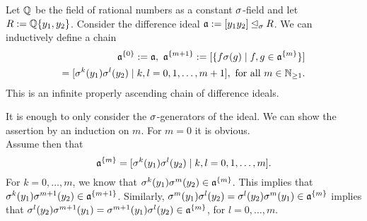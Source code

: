 \begin{ex}\label{nombasisex}
Let $\mathbb{Q}$ be the field of rational numbers as a constant $\sigma$-field and let $R:= \mathbb{Q}\{y_1,y_2\}$. Consider the difference ideal $\mathfrak{a}:= [y_1y_2] \unlhd_{\sigma} R$. We can inductively define a chain \begin{align*}\mathfrak{a}^{\{0\}}:= \mathfrak{a},~ \mathfrak{a}^{\{m+1\}}:= [\{ f \sigma(g) \mid f,g \in \mathfrak{a}^{\{m\}}\}] \\ = [\sigma^k(y_1)\sigma^l(y_2) \mid k,l = 0,1,\ldots,m+1], \text{ for all } m \in \mathbb{N}_{\geq1}.\end{align*}
This is an infinite properly ascending chain of difference ideals. 

\begin{bew}
It is enough to only consider the $\sigma$-generators of the ideal. We can show the assertion by an induction on $m$. For $m=0$ it is obvious. \\
Assume then that $$\mathfrak{a}^{\{m\}} = [\sigma^k(y_1)\sigma^l(y_2) \mid k,l = 0,1,\ldots,m].$$
For $k = 0,\ldots,m$, we know that $\sigma^k(y_1)\sigma^m(y_2) \in \mathfrak{a}^{\{m\}}$. This implies that $\sigma^k(y_1)\sigma^{m+1}(y_2) \in \mathfrak{a}^{\{m+1\}}$.
Similarly, $\sigma^m(y_1)\sigma^l(y_2) = \sigma^l(y_2)\sigma^m(y_1) \in \mathfrak{a}^{\{m\}}$ implies that $ \sigma^l(y_2)\sigma^{m+1}(y_1) = \sigma^{m+1}(y_1)\sigma^l(y_2) \in \mathfrak{a}^{\{m\}}$, for $l = 0,\ldots,m$.
\end{bew}



\end{ex}


